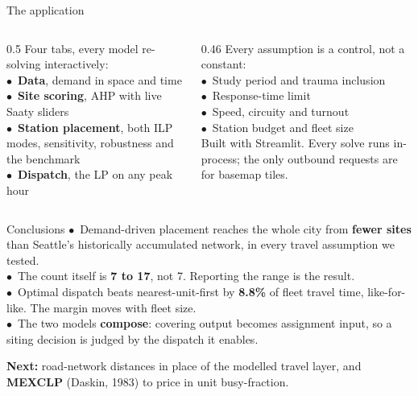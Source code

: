 \documentclass[aspectratio=169,10pt]{beamer}
\newcommand{\hairline}[1][0.6em]{%
  \par\vspace{0.3em}\noindent{\color{rule}\rule{\textwidth}{0.6pt}}\par\vspace{#1}%
}
\begin{document}
\begin{frame}{The application}
  \vspace{0.6em}
  \begin{columns}[T,onlytextwidth]
    \begin{column}{0.5\textwidth}
      {\color{inks}Four tabs, every model re-solving interactively:}\\[0.6em]
      {\footnotesize\color{inks}
      $\bullet$\ \textbf{Data}, demand in space and time\\[0.3em]
      $\bullet$\ \textbf{Site scoring}, AHP with live Saaty sliders\\[0.3em]
      $\bullet$\ \textbf{Station placement}, both ILP modes, sensitivity,
      robustness and the benchmark\\[0.3em]
      $\bullet$\ \textbf{Dispatch}, the LP on any peak hour}
    \end{column}
    \begin{column}{0.46\textwidth}
      {\color{inks}Every assumption is a control, not a constant:}\\[0.6em]
      {\footnotesize\color{inks}
      $\bullet$\ Study period and trauma inclusion\\[0.3em]
      $\bullet$\ Response-time limit\\[0.3em]
      $\bullet$\ Speed, circuity and turnout\\[0.3em]
      $\bullet$\ Station budget and fleet size}\\[0.9em]
      {\footnotesize\color{inkm}Built with Streamlit. Every solve runs
      in-process; the only outbound requests are for basemap tiles.}
    \end{column}
  \end{columns}
\end{frame}

\begin{frame}{Conclusions}
  \vspace{0.6em}
  {\color{inks}
  $\bullet$\ Demand-driven placement reaches the whole city from
  \textbf{fewer sites} than Seattle's historically accumulated network, in
  every travel assumption we tested.\\[0.7em]
  $\bullet$\ The count itself is \textbf{7 to 17}, not 7. Reporting the range
  is the result.\\[0.7em]
  $\bullet$\ Optimal dispatch beats nearest-unit-first by \textbf{8.8\%} of
  fleet travel time, like-for-like. The margin moves with fleet
  size.\\[0.7em]
  $\bullet$\ The two models \textbf{compose}: covering output becomes
  assignment input, so a siting decision is judged by the dispatch it
  enables.}
  \vspace{1.0em}
  \hairline[0.5em]
  {\footnotesize\color{inks}\textbf{Next:} road-network distances in place of
  the modelled travel layer, and \textbf{MEXCLP} (Daskin, 1983) to price in
  unit busy-fraction.}
\end{frame}
\end{document}
